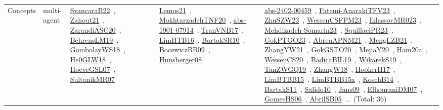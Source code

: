 {\begin{longtable}{lp{3cm}>{\raggedright\arraybackslash}p{6cm}>{\raggedright\arraybackslash}p{6cm}>{\raggedright\arraybackslash}p{8cm}}
\index{multi-agent}\index{Concepts!multi-agent}Concepts & multi-agent & \href{../works/SvancaraB22.pdf}{SvancaraB22}~\cite{SvancaraB22}, \href{../works/Zahout21.pdf}{Zahout21}~\cite{Zahout21}, \href{../works/ZarandiASC20.pdf}{ZarandiASC20}~\cite{ZarandiASC20}, \href{../works/BehrensLM19.pdf}{BehrensLM19}~\cite{BehrensLM19}, \href{../works/GombolayWS18.pdf}{GombolayWS18}~\cite{GombolayWS18}, \href{../works/He0GLW18.pdf}{He0GLW18}~\cite{He0GLW18}, \href{../works/HoeveGSL07.pdf}{HoeveGSL07}~\cite{HoeveGSL07}, \href{../works/SultanikMR07.pdf}{SultanikMR07}~\cite{SultanikMR07} & \href{../works/Lemos21.pdf}{Lemos21}~\cite{Lemos21}, \href{../works/MokhtarzadehTNF20.pdf}{MokhtarzadehTNF20}~\cite{MokhtarzadehTNF20}, \href{../works/abs-1901-07914.pdf}{abs-1901-07914}~\cite{abs-1901-07914}, \href{../works/TranVNB17.pdf}{TranVNB17}~\cite{TranVNB17}, \href{../works/LimHTB16.pdf}{LimHTB16}~\cite{LimHTB16}, \href{../works/BartakSR10.pdf}{BartakSR10}~\cite{BartakSR10}, \href{../works/BocewiczBB09.pdf}{BocewiczBB09}~\cite{BocewiczBB09}, \href{../works/Hunsberger08.pdf}{Hunsberger08}~\cite{Hunsberger08} & \href{../works/abs-2402-00459.pdf}{abs-2402-00459}~\cite{abs-2402-00459}, \href{../works/Fatemi-AnarakiTFV23.pdf}{Fatemi-AnarakiTFV23}~\cite{Fatemi-AnarakiTFV23}, \href{../works/ZhuSZW23.pdf}{ZhuSZW23}~\cite{ZhuSZW23}, \href{../works/WessenCSFPM23.pdf}{WessenCSFPM23}~\cite{WessenCSFPM23}, \href{../works/IklassovMR023.pdf}{IklassovMR023}~\cite{IklassovMR023}, \href{../works/Mehdizadeh-Somarin23.pdf}{Mehdizadeh-Somarin23}~\cite{Mehdizadeh-Somarin23}, \href{../works/SquillaciPR23.pdf}{SquillaciPR23}~\cite{SquillaciPR23}, \href{../works/GokPTGO23.pdf}{GokPTGO23}~\cite{GokPTGO23}, \href{../works/AbreuAPNM21.pdf}{AbreuAPNM21}~\cite{AbreuAPNM21}, \href{../works/MengLZB21.pdf}{MengLZB21}~\cite{MengLZB21}, \href{../works/ZhangYW21.pdf}{ZhangYW21}~\cite{ZhangYW21}, \href{../works/GokGSTO20.pdf}{GokGSTO20}~\cite{GokGSTO20}, \href{../works/MejiaY20.pdf}{MejiaY20}~\cite{MejiaY20}, \href{../works/Ham20a.pdf}{Ham20a}~\cite{Ham20a}, \href{../works/WessenCS20.pdf}{WessenCS20}~\cite{WessenCS20}, \href{../works/BadicaBIL19.pdf}{BadicaBIL19}~\cite{BadicaBIL19}, \href{../works/WikarekS19.pdf}{WikarekS19}~\cite{WikarekS19}, \href{../works/TanZWGQ19.pdf}{TanZWGQ19}~\cite{TanZWGQ19}, \href{../works/ZhangW18.pdf}{ZhangW18}~\cite{ZhangW18}, \href{../works/HookerH17.pdf}{HookerH17}~\cite{HookerH17}, \href{../works/LimBTBB15.pdf}{LimBTBB15}~\cite{LimBTBB15}, \href{../works/LimBTBB15a.pdf}{LimBTBB15a}~\cite{LimBTBB15a}, \href{../works/KoschB14.pdf}{KoschB14}~\cite{KoschB14}, \href{../works/BartakS11.pdf}{BartakS11}~\cite{BartakS11}, \href{../works/Salido10.pdf}{Salido10}~\cite{Salido10}, \href{../works/Jans09.pdf}{Jans09}~\cite{Jans09}, \href{../works/ElhouraniDM07.pdf}{ElhouraniDM07}~\cite{ElhouraniDM07}, \href{../works/GomesHS06.pdf}{GomesHS06}~\cite{GomesHS06}, \href{../works/AbrilSB05.pdf}{AbrilSB05}~\cite{AbrilSB05}... (Total: 36)\\

\end{longtable}}
